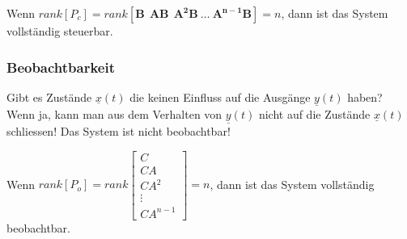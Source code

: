 Wenn $rank \left[P_{c}\right] = rank \left[ \boldsymbol{B~~AB~~ A^2B~\ldots~
A^{n-1}B} \right] = n $, dann ist das System vollständig steuerbar.


\subsubsection{Beobachtbarkeit }
Gibt es Zustände $\underline{x}(t)$ die keinen Einfluss auf die Ausgänge
$\underline{y}(t)$ haben? Wenn ja, kann man aus dem Verhalten von 
$\underline{y}(t)$ nicht auf die Zustände $\underline{x}(t)$ schliessen!
Das System ist nicht beobachtbar!


Wenn $rank \left[P_{o}\right] = rank 
\left[\begin{array}{c}
 C\\
 CA\\
CA^2\\
\vdots \\
CA^{n-1}
\end{array}\right]
 = n$, dann ist das System vollständig
beobachtbar.

